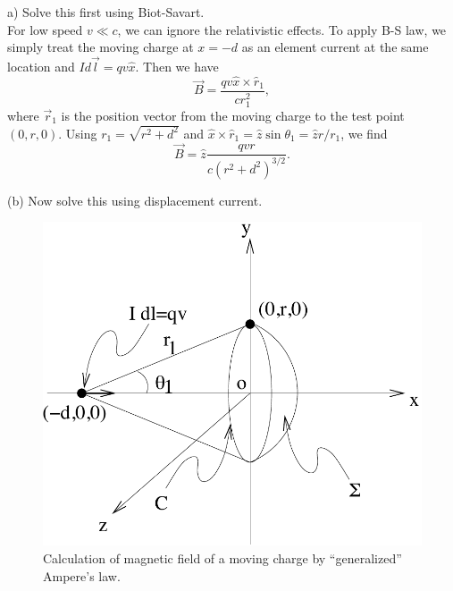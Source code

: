\documentclass[makesolutionspdf]{esg8022pset}
\begin{document}
\begin{solution}
a) Solve this first using Biot-Savart.\\

For low speed $v\ll c$, we can ignore the relativistic effects.  To
apply B-S law, we simply treat the moving charge at $x=-d$ as an
element current at the same location and $I d\vec{l}=qv\hat{x}$.  Then
we have 
\begin{equation}
\vec{B}= \frac{qv\hat{x}\times\hat{r}_1}{cr_1^2},
\end{equation}
where $\vec{r}_1$ is the position vector from the moving charge to the
test point $(0,r,0)$.  Using $r_1 = \sqrt{r^2 + d^2}$ and $\hat
x\times\hat r_1 = \hat z\sin\theta_1 = \hat z r/r_1$, we find
\begin{equation}
\vec{B}= \hat{z}\frac{qvr}{c(r^2+d^2)^{3/2}}.
\end{equation}

(b) Now solve this using displacement current.\\

 \begin{figure}[H]
    \centering
    \includegraphics[width = 15cm]{m6}
    \caption{Calculation of magnetic field of a moving charge by
``generalized'' Ampere's law.}
  \end{figure}


\end{solution}
\end{document}
